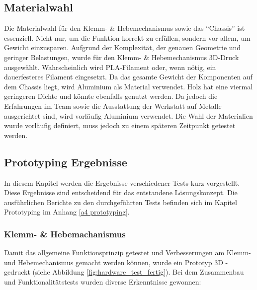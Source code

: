 \documentclass[../main.tex]{subfiles}
\begin{document}
\subsection{Materialwahl}
Die Materialwahl für den Klemm- \& Hebemechanismus sowie das \enquote{Chassis} ist essenziell. Nicht nur, um die Funktion korrekt zu erfüllen, sondern vor allem, um Gewicht einzusparen. Aufgrund der Komplexität, der genauen Geometrie und geringer Belastungen, wurde für den Klemm- \& Hebemechanismus 3D-Druck ausgewählt. Wahrscheinlich wird PLA-Filament oder, wenn nötig, ein dauerfesteres Filament eingesetzt. Da das gesamte Gewicht der Komponenten auf dem Chassis liegt, wird Aluminium als Material verwendet. Holz hat eine viermal geringeren Dichte und könnte ebenfalls genutzt werden. Da jedoch die Erfahrungen im Team sowie die Ausstattung der Werkstatt auf Metalle ausgerichtet sind, wird vorläufig Aluminium verwendet. Die Wahl der Materialien wurde vorläufig definiert, muss jedoch zu einem späteren Zeitpunkt getestet werden.



\subsection{Prototyping Ergebnisse}
In diesem Kapitel werden die Ergebnisse verschiedener Tests kurz vorgestellt. Diese Ergebnisse sind entscheidend für das entstandene Lösungskonzept.
Die ausführlichen Berichte zu den durchgeführten Tests befinden sich im Kapitel Prototyping im Anhang \ref{a4 prototyping}.

\subsubsection{Klemm- \& Hebemachanismus} \label{sec:hardware_greifarm}
Damit das allgemeine Funktionsprinzip getestet und Verbesserungen am Klemm- und Hebemechanismus gemacht werden können, wurde ein Prototyp 3D - gedruckt (siehe Abbildung \ref{fig:hardware_test_fertig}). Bei dem Zusammenbau und Funktionalitätstests wurden diverse Erkenntnisse gewonnen:
\end{document}
